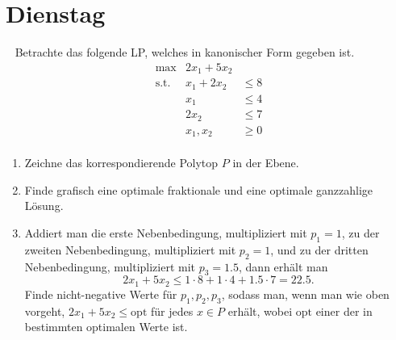 \documentclass{uebung_cs}
\begin{document}
\section*{Dienstag}

\begin{exercise}\
%
	Betrachte das folgende \acs{LP}, welches in kanonischer Form gegeben ist.
	\[
		\begin{array}{rrllll}
			\text{max} &   2 x_1 +5 x_2 \\	
			\text{s.t.} 
			&  x_1 + 2x_2 &\leq 8\\
			&  x_1  &\leq 4\\
			& 2x_2 &\leq 7\\
			& x_1,x_2&\geq  0\\
		\end{array}
	\] 
	
	\begin{enumerate}
		\item\easy Zeichne das korrespondierende Polytop $P$ in der Ebene.
		\item\easy Finde grafisch eine optimale fraktionale und eine optimale ganzzahlige Lösung.
		\item\medium Addiert man die erste Nebenbedingung, multipliziert mit $p_1 = 1$, zu der zweiten Nebenbedingung, multipliziert mit $p_2 = 1$, und zu der dritten Nebenbedingung, multipliziert mit $p_3 = 1.5$, dann erhält man
		$$2x_1+5x_2\leq 1\cdot 8+ 1\cdot 4+1.5\cdot 7= 22.5.$$
		Finde nicht-negative Werte für $p_1, p_2, p_3$, sodass man, wenn man wie oben vorgeht, $2x_1 + 5x_2 \leq \mathrm{opt}$ für jedes $x \in P$ erhält, wobei $\mathrm{opt}$ einer der in  bestimmten optimalen Werte ist.
	\end{enumerate}
\end{exercise}
\end{document}

